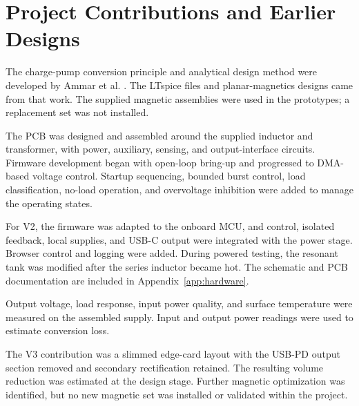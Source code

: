 \section{Project Contributions and Earlier Designs}
\label{sec:intro-contributions}

The charge-pump conversion principle and analytical design method were developed by Ammar et al. \cite{ammar2020chargepump,ammar2021led}. The LTspice files and planar-magnetics designs came from that work. The supplied magnetic assemblies were used in the prototypes; a replacement set was not installed.

The PCB was designed and assembled around the supplied inductor and transformer, with power, auxiliary, sensing, and output-interface circuits. Firmware development began with open-loop bring-up and progressed to DMA-based voltage control. Startup sequencing, bounded burst control, load classification, no-load operation, and overvoltage inhibition were added to manage the operating states.

For V2, the firmware was adapted to the onboard MCU, and control, isolated feedback, local supplies, and USB-C output were integrated with the power stage. Browser control and logging were added. During powered testing, the resonant tank was modified after the series inductor became hot. The schematic and PCB documentation are included in Appendix~\ref{app:hardware}.

Output voltage, load response, input power quality, and surface temperature were measured on the assembled supply. Input and output power readings were used to estimate conversion loss.

The V3 contribution was a slimmed edge-card layout with the USB-PD output section removed and secondary rectification retained. The resulting volume reduction was estimated at the design stage. Further magnetic optimization was identified, but no new magnetic set was installed or validated within the project.
